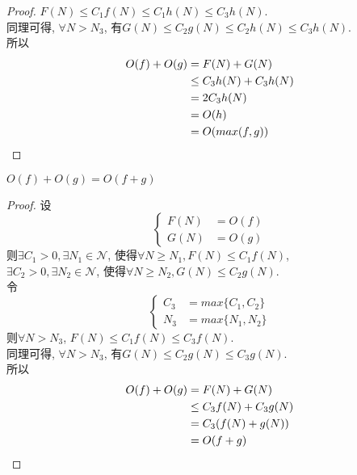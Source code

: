 \documentclass[a4paper]{ctexart}
\begin{document}
\begin{sloppypar}
\begin{proof}
        $F(N) \leq C_1f(N) \leq C_1h(N) \leq C_3h(N)$.\\
        同理可得, $\forall N > N_3$,
        有$G(N) \leq C_2g(N) \leq C_2h(N) \leq C_3h(N)$.\\
        所以
        \begin{align*}
            O(f) + O(g) & = F(N) + G(N)          \\
                        & \leq C_3h(N) + C_3h(N) \\
                        & = 2C_3h(N)             \\
                        & = O(h)                 \\
                        & = O(max(f, g))
            \qedhere  %
        \end{align*}
    \end{proof}
    \vspace{1em}

    \begin{theorem}
        $O(f) + O(g) = O(f + g)$
    \end{theorem}
    \begin{proof}
        设
        \begin{equation}
            \left\{
            \begin{aligned}
                \nonumber
                F(N) & = O(f) \\
                G(N) & = O(g)
            \end{aligned}
            \right.
        \end{equation}
        则$\exists C_1 > 0, \exists N_1 \in \mathcal{N}$,
        使得$\forall N \geq N_1, F(N) \leq C_1f(N)$,\\
        $\exists C_2 > 0, \exists N_2 \in \mathcal{N}$,
        使得$\forall N \geq N_2, G(N) \leq C_2g(N)$.\\
        令
        \begin{equation}
            \left\{
            \begin{aligned}
                \nonumber
                C_3 & = max\{C_1, C_2\} \\
                N_3 & = max\{N_1, N_2\}
            \end{aligned}
            \right.
        \end{equation}
        则$\forall N > N_3$,
        $F(N) \leq C_1f(N) \leq C_3f(N)$.\\
        同理可得, $\forall N > N_3$,
        有$G(N) \leq C_2g(N) \leq C_3g(N)$.\\
        所以
        \begin{align*}
            O(f) + O(g) & = F(N) + G(N)          \\
                        & \leq C_3f(N) + C_3g(N) \\
                        & = C_3(f(N) + g(N))     \\
                        & = O(f + g)
            \qedhere
        \end{align*}
    \end{proof}
    \vspace{1em}


\end{sloppypar}
\end{document}

